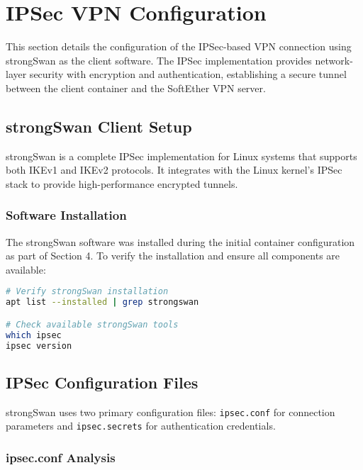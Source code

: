 \newpage

\section{IPSec VPN Configuration}

This section details the configuration of the IPSec-based VPN connection using strongSwan as the client software. The IPSec implementation provides network-layer security with encryption and authentication, establishing a secure tunnel between the client container and the SoftEther VPN server.

\subsection{strongSwan Client Setup}

strongSwan is a complete IPSec implementation for Linux systems that supports both IKEv1 and IKEv2 protocols. It integrates with the Linux kernel's IPSec stack to provide high-performance encrypted tunnels.

\subsubsection{Software Installation}

The strongSwan software was installed during the initial container configuration as part of Section 4. To verify the installation and ensure all components are available:

\begin{lstlisting}[language=bash]
# Verify strongSwan installation
apt list --installed | grep strongswan

# Check available strongSwan tools
which ipsec
ipsec version

\end{lstlisting}

\subsection{IPSec Configuration Files}

strongSwan uses two primary configuration files: \texttt{ipsec.conf} for connection parameters and \texttt{ipsec.secrets} for authentication credentials.

\subsubsection{ipsec.conf Analysis}

